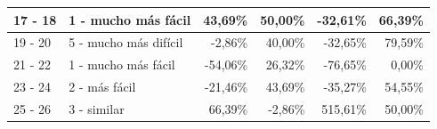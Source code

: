 \documentclass[letterpaper,12pt]{article}
\begin{document}
\begin{table}[H]
\begin{tabular}{|l|l|r|r|r|r|}
    17 - 18         & 1 - mucho más fácil                                                            & 43,69\%                                                                                                   & 50,00\%                                                                                        & -32,61\%                                                                                  & 66,39\%                                                                                  \\ \hline
    19 - 20         & 5 - mucho más difícil                                                          & -2,86\%                                                                                                   & 40,00\%                                                                                        & -32,65\%                                                                                  & 79,59\%                                                                                  \\ \hline
    21 - 22         & 1 - mucho más fácil                                                            & -54,06\%                                                                                                  & 26,32\%                                                                                        & -76,65\%                                                                                  & 0,00\%                                                                                   \\ \hline
    23 - 24         & 2 - más fácil                                                                  & -21,46\%                                                                                                  & 43,69\%                                                                                        & -35,27\%                                                                                  & 54,55\%                                                                                  \\ \hline
    25 - 26         & 3 - similar                                                                    & 66,39\%                                                                                                   & -2,86\%                                                                                        & 515,61\%                                                                                  & 50,00\%                                                                                  \\ \hline

\end{tabular}
\end{table}
\end{document}

